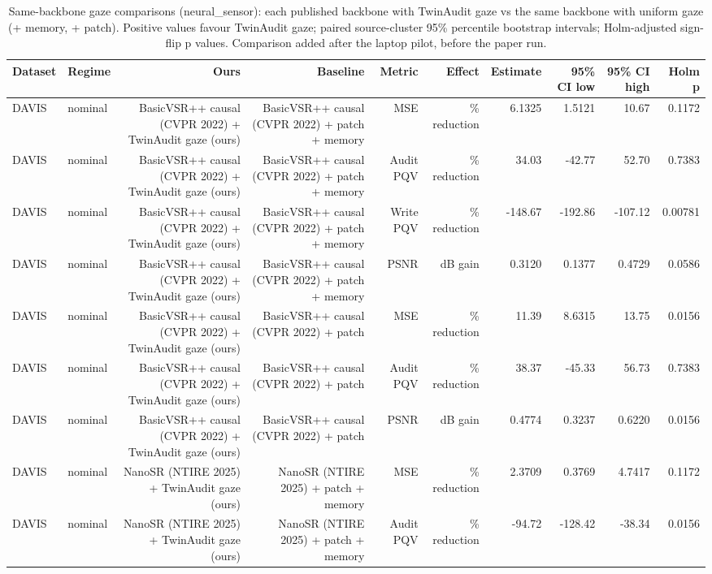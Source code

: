 \begin{table}[t]
\centering
\caption{Same-backbone gaze comparisons (neural\_sensor): each published backbone with TwinAudit gaze vs the same backbone with uniform gaze (+ memory, + patch). Positive values favour TwinAudit gaze; paired source-cluster 95\% percentile bootstrap intervals; Holm-adjusted sign-flip p values. Comparison added after the laptop pilot, before the paper run.}
\label{tab:backbone_gaze_neural_sensor}
\small
\begin{tabular}{llrrrrrrrr}
\toprule
Dataset & Regime & Ours & Baseline & Metric & Effect & Estimate & 95\% CI low & 95\% CI high & Holm p \\
\midrule
DAVIS & nominal & BasicVSR++ causal (CVPR 2022) + TwinAudit gaze (ours) & BasicVSR++ causal (CVPR 2022) + patch + memory & MSE & \% reduction & 6.1325 & 1.5121 & 10.67 & 0.1172 \\
DAVIS & nominal & BasicVSR++ causal (CVPR 2022) + TwinAudit gaze (ours) & BasicVSR++ causal (CVPR 2022) + patch + memory & Audit PQV & \% reduction & 34.03 & -42.77 & 52.70 & 0.7383 \\
DAVIS & nominal & BasicVSR++ causal (CVPR 2022) + TwinAudit gaze (ours) & BasicVSR++ causal (CVPR 2022) + patch + memory & Write PQV & \% reduction & -148.67 & -192.86 & -107.12 & 0.00781 \\
DAVIS & nominal & BasicVSR++ causal (CVPR 2022) + TwinAudit gaze (ours) & BasicVSR++ causal (CVPR 2022) + patch + memory & PSNR & dB gain & 0.3120 & 0.1377 & 0.4729 & 0.0586 \\
DAVIS & nominal & BasicVSR++ causal (CVPR 2022) + TwinAudit gaze (ours) & BasicVSR++ causal (CVPR 2022) + patch & MSE & \% reduction & 11.39 & 8.6315 & 13.75 & 0.0156 \\
DAVIS & nominal & BasicVSR++ causal (CVPR 2022) + TwinAudit gaze (ours) & BasicVSR++ causal (CVPR 2022) + patch & Audit PQV & \% reduction & 38.37 & -45.33 & 56.73 & 0.7383 \\
DAVIS & nominal & BasicVSR++ causal (CVPR 2022) + TwinAudit gaze (ours) & BasicVSR++ causal (CVPR 2022) + patch & PSNR & dB gain & 0.4774 & 0.3237 & 0.6220 & 0.0156 \\
DAVIS & nominal & NanoSR (NTIRE 2025) + TwinAudit gaze (ours) & NanoSR (NTIRE 2025) + patch + memory & MSE & \% reduction & 2.3709 & 0.3769 & 4.7417 & 0.1172 \\
DAVIS & nominal & NanoSR (NTIRE 2025) + TwinAudit gaze (ours) & NanoSR (NTIRE 2025) + patch + memory & Audit PQV & \% reduction & -94.72 & -128.42 & -38.34 & 0.0156 \\

\end{tabular}
\end{table}
